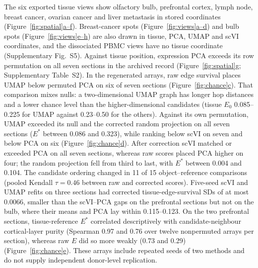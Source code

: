 \documentclass[11pt]{article}
\newcommand{\figpanel}[2]{Figure~\hyperref[#1]{\ref*{#1}#2}}
\begin{document}
The six exported tissue views show olfactory bulb, prefrontal cortex, lymph node, breast cancer, ovarian cancer and liver metastasis in stored coordinates (\figpanel{fig:spatial}{a--f}). Breast-cancer spots (\figpanel{fig:views}{a--d}) and bulb spots (\figpanel{fig:views}{e--h}) are also drawn in tissue, PCA, UMAP and scVI coordinates, and the dissociated PBMC views have no tissue coordinate (Supplementary Fig.~S5). Against tissue position, expression PCA exceeds its row permutation on all seven sections in the archived record (\figpanel{fig:spatial}{g}; Supplementary Table~S2). In the regenerated arrays, raw edge survival places UMAP below permuted PCA on six of seven sections (\figpanel{fig:chance}{c}). That comparison mixes nulls: a two-dimensional UMAP graph has longer hop distances and a lower chance level than the higher-dimensional candidates (tissue $E_0$ 0.085--0.225 for UMAP against 0.23--0.50 for the others). Against its own permutation, UMAP exceeded its null and the corrected random projection on all seven sections ($E^*$ between 0.086 and 0.323), while ranking below scVI on seven and below PCA on six (\figpanel{fig:chance}{d}). After correction scVI matched or exceeded PCA on all seven sections, whereas raw scores placed PCA higher on four; the random projection fell from third to last, with $E^*$ between 0.004 and 0.104. The candidate ordering changed in 11 of 15 object--reference comparisons (pooled Kendall $\tau=0.46$ between raw and corrected scores). Five-seed scVI and UMAP refits on three sections had corrected tissue-edge-survival SDs of at most 0.0066, smaller than the scVI--PCA gaps on the prefrontal sections but not on the bulb, where their means and PCA lay within 0.115--0.123. On the two prefrontal sections, tissue-reference $E^*$ correlated descriptively with candidate-neighbour cortical-layer purity (Spearman 0.97 and 0.76 over twelve nonpermuted arrays per section), whereas raw $E$ did so more weakly (0.73 and 0.29) (\figpanel{fig:chance}{e}). These arrays include repeated seeds of two methods and do not supply independent donor-level replication.
\end{document}
